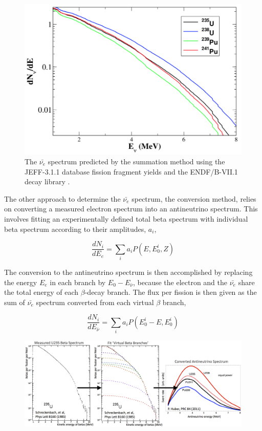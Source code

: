 \begin{figure}[t]
	\centering
	\includegraphics[width=0.7\linewidth]{tex/3-reactorneutrinos-images/Spectrum}
	\caption{The $\bar{\nu_e}$ spectrum predicted by the summation method using the JEFF-3.1.1 database fission fragment yields and the ENDF/B-VII.1 decay library \cite{HayesVogel}.}
	\label{fig:spectrum}
\end{figure}

The other approach to determine the $\bar{\nu_{e}}$ spectrum, the conversion method, relies on converting a measured electron spectrum into an antineutrino spectrum. 
This involves fitting an experimentally defined total beta spectrum with individual beta spectrum  according to their amplitudes, $a_i$, 

\begin{equation}
	\frac{dN_i}{dE_e} = \sum_{i}a_iP(E,E^i_0,Z)
\end{equation}

The conversion to the antineutrino spectrum is then accomplished by replacing the energy $E_e$ in each branch by $E_0 - E_{\bar{\nu}}$, because the electron and the $\bar{\nu_e}$ share the total energy of each $\beta$-decay branch.
The flux per fission is then given as the sum of $\bar{\nu_e}$ spectrum converted from each virtual $\beta$ branch,

\begin{equation}
	\frac{dN_i}{dE_{\bar{\nu}}} = \sum_{i}a_iP(E^i_0-E,E^i_0)
\end{equation}

\begin{figure}
	\centering
	\includegraphics[width=0.7\linewidth]{tex/3-reactorneutrinos-images/betaspecconversion_fixed}
	\caption{}
	\label{fig:betaspecconversionfixed}
\end{figure}

